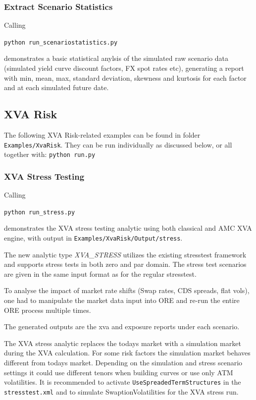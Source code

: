 \subsubsection{Extract Scenario Statistics}

Calling 

\medskip
\centerline {\tt python run\_scenariostatistics.py} 

\medskip
demonstrates a basic statistical anylsis of the simulated raw scenario data (simulated yield curve discount factors, FX spot rates etc), generating a report
with min, mean, max, standard deviation, skewness and kurtosis for each factor and at each simulated future date.

\subsection{XVA Risk}\label{example:xvarisk}

The following XVA Risk-related examples can be found in folder {\tt Examples/XvaRisk}.
They can be run individually as discussed below, or all together with: {\tt python run.py} 

\subsubsection{XVA Stress Testing}\label{example:xvarisk_stress}

Calling

\medskip
\centerline {\tt python run\_stress.py} 

\medskip
demonstrates the XVA stress testing analytic using both classical and AMC XVA engine,
with output in {\tt Examples/XvaRisk/Output/stress}.

The new analytic type \emph{XVA\_STRESS} utilizes the existing stresstest framework and supports
stress tests in both zero and par domain. 
The stress test scenarios are given in the same input format as for the regular stresstest. 

To analyse the impact of market rate shifts (Swap rates, CDS spreads, flat vols), one had to
manipulate the market data input into ORE and re-run the entire ORE process multiple times.

The generated outputs are the xva and exposure reports under each scenario.

The XVA stress analytic replaces the todays market with a simulation market during the XVA calculation.
For some risk factors the simulation market behaves different from todays market.
Depending on the simulation and stress scenario settings it could use different tenors when building curves 
or use only ATM volatilities. It is recommended to activate {\tt UseSpreadedTermStructures} in the
{\tt stresstest.xml} and to simulate SwaptionVolatilities for the XVA stress run.

